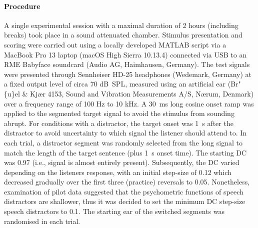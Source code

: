 \documentclass[a4paper, twoside]{templates/ociamthesis}
\begin{document}
\hypertarget{procedure}{%
\paragraph{Procedure}\label{procedure}}

\hfill\break
A single experimental session with a maximal duration of 2 hours (including breaks) took place in a sound attenuated chamber. Stimulus presentation and scoring were carried out using a locally developed MATLAB script via a MacBook Pro 13 laptop (macOS High Sierra 10.13.4) connected via USB to an RME Babyface soundcard (Audio AG, Haimhausen, Germany). The test signals were presented through Sennheiser HD-25 headphones (Wedemark, Germany) at a fixed output level of circa 70 dB~SPL, measured using an artificial ear (Br"\{u\}el \& Kjær 4153, Sound and Vibration Measurements A/S, Nærum, Denmark) over a frequency range of 100 Hz to 10 kHz. A 30~ms long cosine onset ramp was applied to the segmented target signal to avoid the stimulus from sounding abrupt. For conditions with a distractor, the target onset was 1~s after the distractor to avoid uncertainty to which signal the listener should attend to. In each trial, a distractor segment was randomly selected from the long signal to match the length of the target sentence (plus 1~s onset time). The starting DC was 0.97 (i.e., signal is almost entirely present). Subsequently, the DC varied depending on the listeners response, with an initial step-size of 0.12 which decreased gradually over the first three (practice) reversals to 0.05. Nonetheless, examination of pilot data suggested that the psychometric functions of speech distractors are shallower, thus it was decided to set the minimum DC step-size speech distractors to 0.1. The starting ear of the switched segments was randomised in each trial.\\
\end{document}
